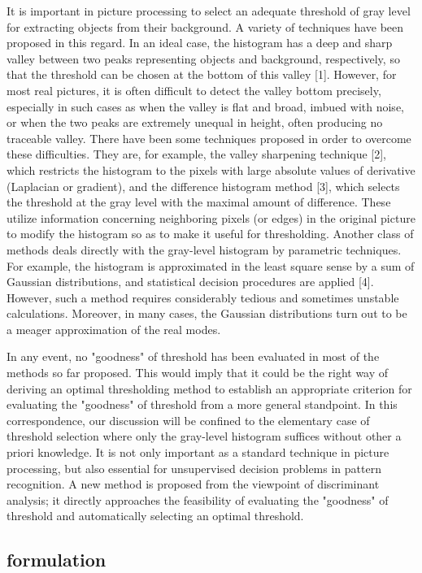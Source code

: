 It is important in picture processing to select an adequate threshold of gray level for extracting objects from their background. A variety of techniques have been proposed in this regard. In an ideal case, the histogram has a deep and sharp valley between two peaks representing objects and background, respectively, so that the threshold can be chosen at the bottom of this valley [1]. However, for most real pictures, it is often difficult to detect the valley bottom precisely, especially in such cases as when the valley is flat and broad, imbued with noise, or when the two peaks are extremely unequal in height, often producing no traceable valley. There have been some techniques proposed in order to overcome these difficulties. They are, for example, the valley sharpening technique [2], which restricts the histogram to the pixels with large absolute values of derivative (Laplacian or gradient), and the difference histogram method [3], which selects the threshold at the gray level with the maximal amount of difference. These utilize information concerning neighboring pixels (or edges) in the original picture to modify the histogram so as to make it useful for thresholding. Another class of methods deals directly with the gray-level histogram by parametric techniques. For example, the histogram is approximated in the least square sense by a sum of Gaussian distributions, and statistical decision procedures are applied [4]. However, such a method requires considerably tedious and sometimes unstable calculations. Moreover, in many cases, the Gaussian distributions turn out to be a meager approximation of the real modes.

In any event, no "goodness" of threshold has been evaluated in most of the methods so far proposed. This would imply that it could be the right way of deriving an optimal thresholding method to establish an appropriate criterion for evaluating the "goodness" of threshold from a more general standpoint. In this correspondence, our discussion will be confined to the elementary case of threshold selection where only the gray-level histogram suffices without other a priori knowledge. It is not only important as a standard technique in picture processing, but also essential for unsupervised decision problems in pattern recognition. A new method is proposed from the viewpoint of discriminant analysis; it directly approaches the feasibility of evaluating the "goodness" of threshold and automatically selecting an optimal threshold.

\subsection*{formulation}


